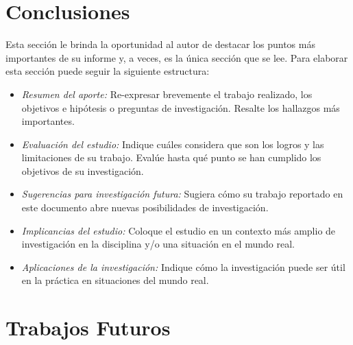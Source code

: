 
\section{Conclusiones}

Esta sección le brinda la oportunidad al autor de destacar los puntos más importantes de su informe y, a veces, es la única sección que se lee. Para elaborar esta sección puede seguir la siguiente estructura:
\begin{itemize}
  \item \textit{Resumen del aporte:} Re-expresar brevemente el trabajo realizado, los objetivos e hipótesis o preguntas de investigación. Resalte los hallazgos más importantes.
  \item \textit{Evaluación del estudio:} Indique cuáles considera que son los logros y las limitaciones de su trabajo. Evalúe hasta qué punto se han cumplido los objetivos de su investigación.
  \item \textit{Sugerencias para investigación futura:} Sugiera cómo su trabajo reportado en este documento abre nuevas posibilidades de investigación.
  \item \textit{Implicancias del estudio:} Coloque el estudio en un contexto más amplio de investigación en la disciplina y/o una situación en el mundo real.
  \item \textit{Aplicaciones de la investigación:} Indique cómo la investigación puede ser útil en la práctica en situaciones del mundo real.
\end{itemize}

\section{Trabajos Futuros}
